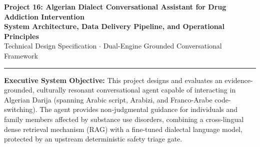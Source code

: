 \documentclass[10pt,a4paper]{article}
\begin{document}

\begin{center}
  {\Large\bfseries\color{primarynavy} Project 16: Algerian Dialect Conversational Assistant for Drug Addiction Intervention}\\[1.5mm]
  {\normalsize\bfseries\color{accentblue} System Architecture, Data Delivery Pipeline, and Operational Principles}\\[1.5mm]
  {\footnotesize\color{gray!80} Technical Design Specification $\cdot$ Dual-Engine Grounded Conversational Framework}
\end{center}

\vspace{1mm}
\noindent\rule{\textwidth}{0.6pt}
\vspace{1.5mm}

\begin{tcolorbox}[colback=slatebg, colframe=slateborder, boxrule=0.5pt, arc=3pt, left=8pt, right=8pt, top=5pt, bottom=5pt]
\footnotesize
\textbf{Executive System Objective:} This project designs and evaluates an evidence-grounded, culturally resonant conversational agent capable of interacting in Algerian Darija (spanning Arabic script, Arabizi, and Franco-Arabe code-switching). The agent provides non-judgmental guidance for individuals and family members affected by substance use disorders, combining a cross-lingual dense retrieval mechanism (RAG) with a fine-tuned dialectal language model, protected by an upstream deterministic safety triage gate.
\end{tcolorbox}

\vspace{2mm}
\vspace{1.5mm}
\end{document}
